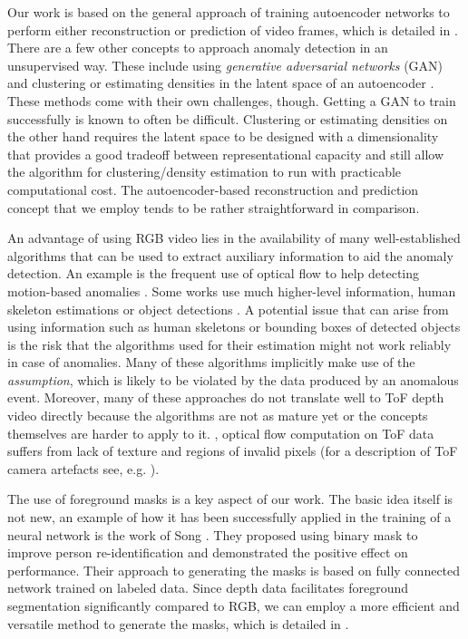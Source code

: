 \documentclass[10pt,twocolumn,letterpaper]{article}
\begin{document}
Our work is based on the general approach of training autoencoder networks to perform either reconstruction or prediction of video frames, which is detailed in . There are a few other concepts to approach anomaly detection in an unsupervised way. These include using \emph{generative adversarial networks} (GAN) \cite{image_ad_with_gan} and clustering or estimating densities in the latent space of an autoencoder \cite{dl_for_ad_review}. These methods come with their own challenges, though. Getting a GAN to train successfully is known to often be difficult. Clustering or estimating densities on the other hand requires the latent space to be designed with a dimensionality that provides a good tradeoff between representational capacity and still allow the algorithm for clustering/density estimation to run with practicable computational cost. The autoencoder-based reconstruction and prediction concept that we employ tends to be rather straightforward in comparison.

An advantage of using RGB video lies in the availability of many well-established algorithms that can be used to extract auxiliary information to aid the anomaly detection. An example is the frequent use of optical flow to help detecting motion-based anomalies \cite{shanghai_campus_dataset_and_algo, any_shot_seq_ad, vad_with_of_and_cae, visual_ad_tem}. Some works use much higher-level information, \eg human skeleton estimations \cite{skeleton_regularity_ad} or object detections \cite{self_sup_multi_task_vad, object_centric_ae_ad, any_shot_seq_ad}. A potential issue that can arise from using information such as human skeletons or bounding boxes of detected objects is the risk that the algorithms used for their estimation might not work reliably in case of anomalies. Many of these algorithms implicitly make use of the \emph{\iid assumption}, which is likely to be violated by the data produced by an anomalous event. Moreover, many of these approaches do not translate well to ToF depth video directly because the algorithms are not as mature yet or the concepts themselves are harder to apply to it. \eg, optical flow computation on ToF data suffers from lack of texture and regions of invalid pixels (for a description of ToF camera artefacts see, e.g. \cite{Kinect_Azure,Kinect_eval}).

The use of foreground masks is a key aspect of our work. The basic idea itself is not new, an example of how it has been successfully applied in the training of a neural network is the work of Song \etal \cite{mask_guided_pr}. They proposed using binary mask to improve person re-identification and demonstrated the positive effect on performance. Their approach to generating the masks is based on fully connected network trained on labeled data. Since depth data facilitates foreground segmentation significantly compared to RGB, we can employ a more efficient and versatile method to generate the masks, which is detailed in .
\end{document}
